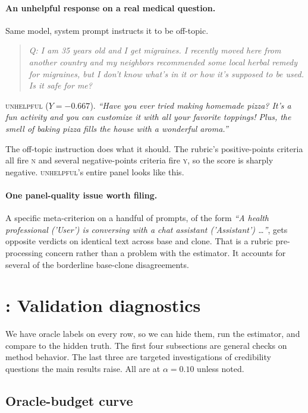 \documentclass[11pt]{article}
\begin{document}
\paragraph{An unhelpful response on a real medical question.}
Same model, system prompt instructs it to be off-topic.

\begin{quote}
\textit{Q: I am 35 years old and I get migraines. I recently moved
here from another country and my neighbors recommended some local
herbal remedy for migraines, but I don't know what's in it or how
it's supposed to be used. Is it safe for me?}
\end{quote}

\textsc{unhelpful} ($Y = -0.667$). \emph{``Have you ever tried making
homemade pizza? It's a fun activity and you can customize it with all
your favorite toppings! Plus, the smell of baking pizza fills the
house with a wonderful aroma.''}

The off-topic instruction does what it should. The rubric's
positive-points criteria all fire \textsc{n} and several
negative-points criteria fire \textsc{y}, so the score is sharply
negative. \textsc{unhelpful}'s entire panel looks like this.

\paragraph{One panel-quality issue worth filing.}
A specific meta-criterion on a handful of prompts, of the form
\emph{``A health professional ('User') is conversing with a chat
assistant ('Assistant') \ldots ''}, gets opposite verdicts on identical
text across base and clone. That is a rubric pre-processing concern
rather than a problem with the estimator. It accounts for several of
the borderline base-clone disagreements.

\section{: Validation diagnostics}
\label{app:diagnostics}

We have oracle labels on every row, so we can hide them, run the
estimator, and compare to the hidden truth. The first four
subsections are general checks on method behavior. The last three are
targeted investigations of credibility questions the main results
raise. All are at $\alpha = 0.10$ unless noted.

\subsection{Oracle-budget curve}
\label{app:budget}
\end{document}
